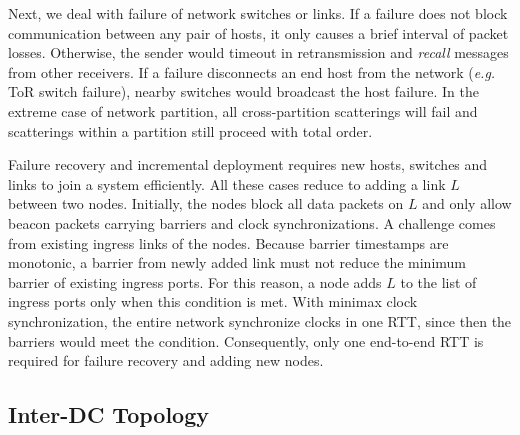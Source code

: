 Next, we deal with failure of network switches or links. If a failure does not block communication between any pair of hosts, it only causes a brief interval of packet losses. Otherwise, the sender would timeout in retransmission and \textit{recall} messages from other receivers. If a failure disconnects an end host from the network (\textit{e.g.} ToR switch failure), nearby switches would broadcast the host failure. In the extreme case of network partition, all cross-partition scatterings will fail and scatterings within a partition still proceed with total order.



Failure recovery and incremental deployment requires new hosts, switches and links to join a \sys system efficiently. All these cases reduce to adding a link $L$ between two nodes.
Initially, the nodes block all data packets on $L$ and only allow beacon packets carrying barriers and clock synchronizations.
A challenge comes from existing ingress links of the nodes. Because barrier timestamps are monotonic, a barrier from newly added link must not reduce the minimum barrier of existing ingress ports.
For this reason, a node adds $L$ to the list of ingress ports only when this condition is met.
With minimax clock synchronization, the entire network synchronize clocks in one RTT, since then the barriers would meet the condition.
Consequently, only one end-to-end RTT is required for failure recovery and adding new nodes.

\iffalse
\subsection{Inter-DC Topology}
\label{sec:inter-dc}


